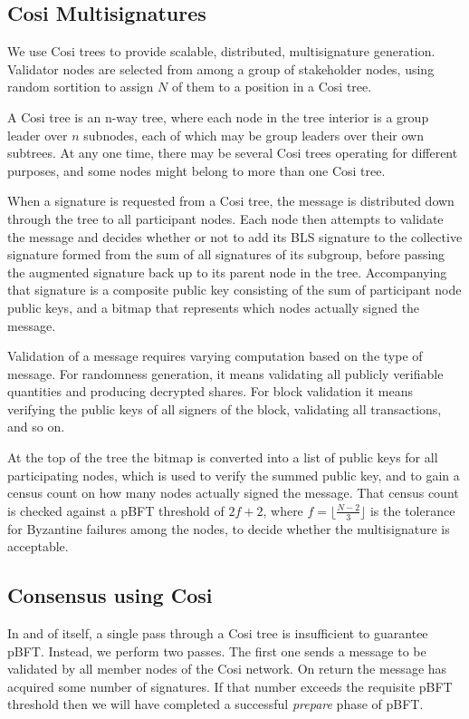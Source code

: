 \documentclass{yellowpaper}
\begin{document}
\subsection{Cosi Multisignatures}
We use Cosi trees\cite{cosi} to provide scalable, distributed, multisignature generation. Validator nodes are selected from among a group of stakeholder nodes, using random sortition to assign $N$ of them to a position in a Cosi tree. 

A Cosi tree is an n-way tree, where each node in the tree interior is a group leader over $n$ subnodes, each of which may be group leaders over their own subtrees. At any one time, there may be several Cosi trees operating for different purposes, and some nodes might belong to more than one Cosi tree.

When a signature is requested from a Cosi tree, the message is distributed down through the tree to all participant nodes. Each node then attempts to validate the message and decides whether or not to add its BLS signature to the collective signature formed from the sum of all signatures of its subgroup, before passing the augmented signature back up to its parent node in the tree. Accompanying that signature is a composite public key consisting of the sum of participant node public keys, and a bitmap that represents which nodes actually signed the message.

Validation of a message requires varying computation based on the type of message. For randomness generation, it means validating all publicly verifiable quantities and producing decrypted shares. For block validation it means verifying the public keys of all signers of the block, validating all transactions, and so on.

At the top of the tree the bitmap is converted into a list of public keys for all participating nodes, which is used to verify the summed public key, and to gain a census count on how many nodes actually signed the message. That census count is checked against a pBFT threshold of $2 f+ 2$, where $f = \lfloor \frac{N-2}{3} \rfloor$ is the tolerance for Byzantine failures among the nodes, to decide whether the multisignature is acceptable. 
\subsection{Consensus using Cosi}
In and of itself, a single pass through a Cosi tree is insufficient to guarantee pBFT. Instead, we perform two passes. The first one sends a message to be validated by all member nodes of the Cosi network. On return the message has acquired some number of signatures. If that number exceeds the requisite pBFT threshold then we will have completed a successful {\em{prepare}} phase of pBFT.
\end{document}
